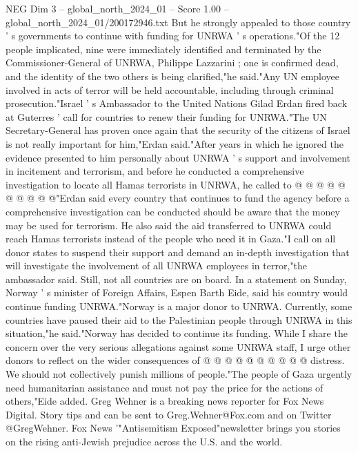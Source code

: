 \begin{textsample}{NEG Dim 3 – global\_north\_2024\_01 – Score 1.00 – global\_north\_2024\_01/200172946.txt}
But he strongly appealed to those country ' s governments to continue with funding for UNRWA ' s operations."Of the 12 people implicated, nine were immediately identified and terminated by the Commissioner-General of UNRWA, Philippe Lazzarini ; one is confirmed dead, and the identity of the two others is being clarified,"he said."Any UN employee involved in acts of terror will be held accountable, including through criminal prosecution."Israel ' s Ambassador to the United Nations Gilad Erdan fired back at Guterres ' call for countries to renew their funding for UNRWA."The UN Secretary-General has proven once again that the security of the citizens of Israel is not really important for him,"Erdan said."After years in which he ignored the evidence presented to him personally about UNRWA ' s support and involvement in incitement and terrorism, and before he conducted a comprehensive investigation to locate all Hamas terrorists in UNRWA, he called to @ @ @ @ @ @ @ @ @ @"Erdan said every country that continues to fund the agency before a comprehensive investigation can be conducted should be aware that the money may be used for terrorism.
He also said the aid transferred to UNRWA could reach Hamas terrorists instead of the people who need it in Gaza."I call on all donor states to suspend their support and demand an in-depth investigation that will investigate the involvement of all UNRWA employees in terror,"the ambassador said.
Still, not all countries are on board.
In a statement on Sunday, Norway ' s minister of Foreign Affairs, Espen Barth Eide, said his country would continue funding UNRWA."Norway is a major donor to UNRWA.
Currently, some countries have paused their aid to the Palestinian people through UNRWA in this situation,"he said."Norway has decided to continue its funding.
While I share the concern over the very serious allegations against some UNRWA staff, I urge other donors to reflect on the wider consequences of @ @ @ @ @ @ @ @ @ @ distress.
We should not collectively punish millions of people."The people of Gaza urgently need humanitarian assistance and must not pay the price for the actions of others,"Eide added.
Greg Wehner is a breaking news reporter for Fox News Digital.
Story tips and can be sent to Greg.Wehner@Fox.com and on Twitter @GregWehner.
Fox News '"Antisemitism Exposed"newsletter brings you stories on the rising anti-Jewish prejudice across the U.S. and the world.

\end{textsample}
